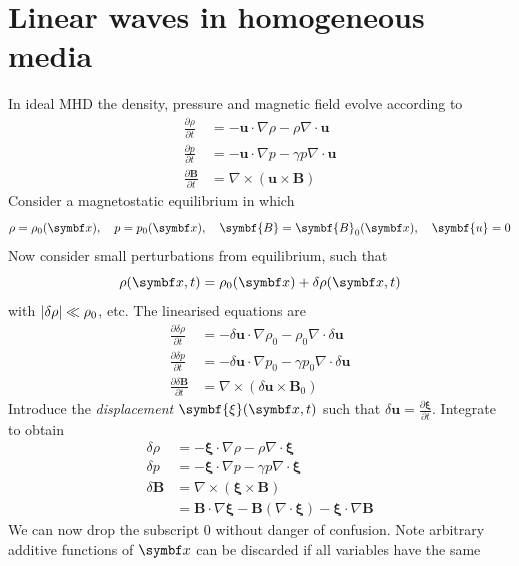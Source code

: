 \documentclass{jknotes}
\newcommand{\B}{\symbf{B}}
\renewcommand{\u}{\symbf{u}}
\newcommand{\disp}{\symbf{\xi}}
\begin{document}
\section{Linear waves in homogeneous media}
\label{sec:pert}
In ideal MHD the density, pressure and magnetic field evolve according to
\begin{align}
	\frac{\partial \rho}{\partial t} &= - \u \cdot \nabla \rho -\rho \nabla
	\cdot \u \\
	\frac{\partial  p}{\partial t} &= -\u \cdot \nabla p - \gamma  p \nabla
	\cdot \u \\
	\frac{\partial \B}{\partial t} &= \nabla \times (\u \times \B)
\end{align}
Consider a magnetostatic equilibrium in which 
\begin{equation}
	\rho = \rho_0(\x), \hspace{1em} p = p_0(\x), \hspace{1em} \B = \B_0(\x),
	\hspace{1em} \u  = 0
\end{equation}
Now consider small perturbations from equilibrium, such that
\begin{equation}
	\rho(\x, t ) = \rho_0(\x) + \delta \rho(\x, t)
\end{equation}
with $\abs{\delta \rho} \ll\rho_0$, etc. The linearised equations are
\begin{align}
	\frac{\partial \delta\rho}{\partial t} &= - \delta\u \cdot \nabla \rho_0
	-\rho_0 \nabla \cdot \delta\u \\
	\frac{\partial  \delta p}{\partial t} &= -\delta\u \cdot \nabla p_0 -
	\gamma  p_0 \nabla \cdot \delta\u \\
	\frac{\partial \delta\B}{\partial t} &= \nabla \times (\delta\u \times
	\B_0)
\end{align}
Introduce the \emph{displacement} $\disp(\x,t)$ such that $\delta \u =
\frac{\partial \disp}{\partial t}$. Integrate to obtain
\begin{align}
	\delta \rho &= -\disp \cdot \nabla \rho - \rho \nabla \cdot \disp \\
	\delta p &= -\disp \cdot \nabla p - \gamma p \nabla \cdot \disp \\
	\delta \B &= \nabla \times (\disp \times \B) \\
			  &= \B \cdot \nabla \disp - \B (\nabla \cdot \disp) - \disp \cdot
			  \nabla \B
\end{align}
We can now drop the subscript $0$ without danger of confusion. Note arbitrary
additive functions of $\x$ can be discarded if all variables have the same
\end{document}
